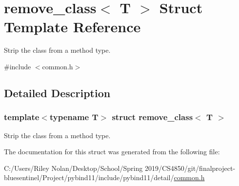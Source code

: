 \hypertarget{structremove__class}{}\section{remove\+\_\+class$<$ T $>$ Struct Template Reference}
\label{structremove__class}


Strip the class from a method type.  




{\ttfamily \#include $<$common.\+h$>$}



\subsection{Detailed Description}
\subsubsection*{template$<$typename T$>$\newline
struct remove\+\_\+class$<$ T $>$}

Strip the class from a method type. 

The documentation for this struct was generated from the following file\+:\begin{DoxyCompactItemize}
\item 
C\+:/\+Users/\+Riley Nolan/\+Desktop/\+School/\+Spring 2019/\+C\+S4850/git/finalproject-\/bluesentinel/\+Project/pybind11/include/pybind11/detail/\mbox{\hyperlink{detail_2common_8h}{common.\+h}}\end{DoxyCompactItemize}
